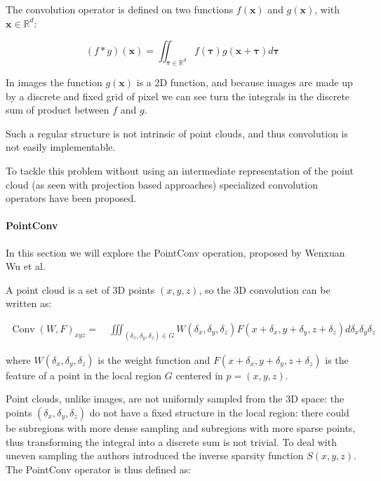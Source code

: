 The convolution operator is defined on two functions $f(\mathbf{x})$ and $g(\mathbf{x})$, with $\mathbf{x} \in \mathbb{R}^{d}$: 

\begin{equation}
    (f * g)(\mathbf{x})=\iint_{\boldsymbol{\tau} \in \mathbb{R}^{d}} f(\boldsymbol{\tau}) g(\mathbf{x}+\boldsymbol{\tau}) d \boldsymbol{\tau}
\end{equation}

In images the function $g(\mathbf{x})$ is a 2D function, and because images are made up by a discrete and fixed grid of pixel we can see turn the integrals in the discrete sum of product between $f$ and $g$.

Such a regular structure is not intrinsic of point clouds, and thus convolution is not easily implementable.

To tackle this problem without using an intermediate representation of the point cloud (as seen with projection based approaches) specialized convolution operators have been proposed.

\paragraph{PointConv}
In this section we will explore the PointConv operation, proposed by Wenxuan Wu et al. \cite{PointConv}

A point cloud is a set of 3D points $(x,y,z)$, so the 3D convolution can be written as: 

\begin{equation}
    \begin{array}{l}
\operatorname{Conv}(W, F)_{x y z}= 
\quad \iiint_{\left(\delta_{x}, \delta_{y}, \delta_{z}\right) \in G} W\left(\delta_{x}, \delta_{y}, \delta_{z}\right) F\left(x+\delta_{x}, y+\delta_{y}, z+\delta_{z}\right) d \delta_{x} \delta_{y} \delta_{z}
\end{array}
\end{equation}

where $W(\delta_{x}, \delta_{y}, \delta_{z})$ is the weight function and $F\left(x+\delta_{x}, y+\delta_{y}, z+\delta_{z}\right)$ is the feature of a point in the local region $G$ centered in  $p = (x,y,z)$.

Point clouds, unlike images, are not uniformly sampled from the 3D space: the points $(\delta_{x}, \delta_{y}, \delta_{z})$ do not have a fixed structure in the local region: there could be subregions with more dense sampling and subregions with more sparse points, thus transforming the integral into a discrete sum is not trivial.
To deal with uneven sampling the authors introduced the inverse sparsity function $S(x,y,z)$. The PointConv operator is thus defined as:

